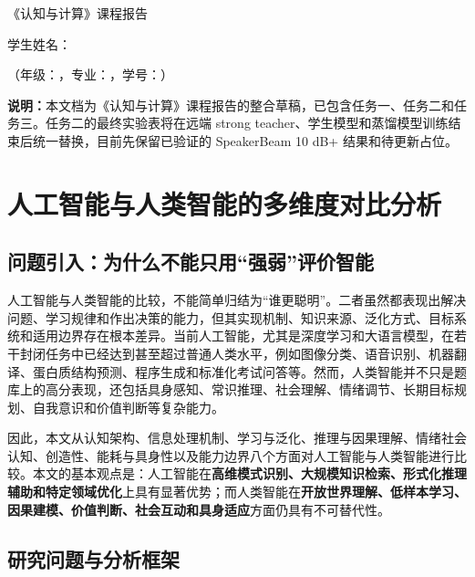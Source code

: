 \documentclass[UTF8,zihao=-4,a4paper]{ctexart}
\begin{document}
\begin{center}
{\heiti 《认知与计算》课程报告}\par
\vspace{2em}
{\songti 学生姓名：\underline{\hspace{4cm}}}\par
{\songti （年级：\underline{\hspace{2.5cm}}，专业：\underline{\hspace{3cm}}，学号：\underline{\hspace{3.5cm}}）}
\end{center}

\vspace{1em}

\noindent\textbf{说明：}本文档为《认知与计算》课程报告的整合草稿，已包含任务一、任务二和任务三。任务二的最终实验表将在远端 strong teacher、学生模型和蒸馏模型训练结束后统一替换，目前先保留已验证的 SpeakerBeam 10 dB+ 结果和待更新占位。

\section{人工智能与人类智能的多维度对比分析}

\subsection{问题引入：为什么不能只用“强弱”评价智能}

人工智能与人类智能的比较，不能简单归结为“谁更聪明”。二者虽然都表现出解决问题、学习规律和作出决策的能力，但其实现机制、知识来源、泛化方式、目标系统和适用边界存在根本差异。当前人工智能，尤其是深度学习和大语言模型，在若干封闭任务中已经达到甚至超过普通人类水平，例如图像分类、语音识别、机器翻译、蛋白质结构预测、程序生成和标准化考试问答等。然而，人类智能并不只是题库上的高分表现，还包括具身感知、常识推理、社会理解、情绪调节、长期目标规划、自我意识和价值判断等复杂能力。

因此，本文从认知架构、信息处理机制、学习与泛化、推理与因果理解、情绪社会认知、创造性、能耗与具身性以及能力边界八个方面对人工智能与人类智能进行比较。本文的基本观点是：人工智能在\textbf{高维模式识别、大规模知识检索、形式化推理辅助和特定领域优化}上具有显著优势；而人类智能在\textbf{开放世界理解、低样本学习、因果建模、价值判断、社会互动和具身适应}方面仍具有不可替代性。

\subsection{研究问题与分析框架}
\end{document}
